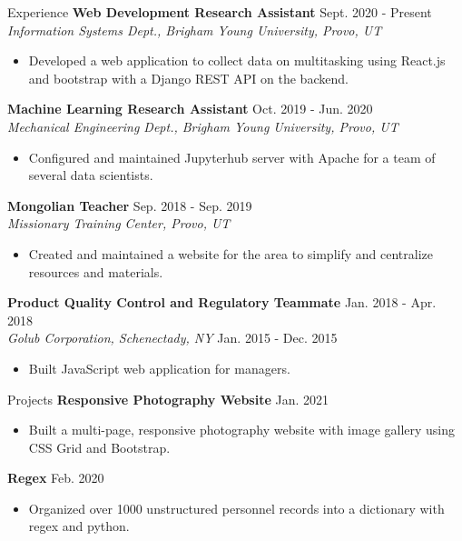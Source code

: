 \documentclass{resume} %
\begin{document}
\begin{rSection}{Experience}
    \textbf{Web Development Research Assistant}\hfill{ Sept.  2020 -
    Present}\\
    \textit{Information Systems Dept., Brigham Young University, Provo, UT} 
    \begin{itemize}
        \item Developed a web application to collect data on multitasking using React.js and
            bootstrap with a Django REST API on the backend. 
    \end{itemize}
\textbf{Machine Learning Research Assistant} \hfill{Oct. 2019
- Jun. 2020}\\
\textit{Mechanical Engineering Dept., Brigham Young University, Provo, UT}
    \begin{itemize}
        \item Configured and maintained Jupyterhub server with Apache for a team of
            several data scientists.
    \end{itemize}
\textbf{Mongolian Teacher} \hfill {Sep. 2018 - Sep. 2019}\\
\textit{Missionary Training Center, Provo, UT} 
    \begin{itemize}
        \item Created and maintained a website for the area to simplify and
            centralize resources and materials.
    \end{itemize}
\textbf{Product Quality Control and Regulatory Teammate}    \hfill {Jan. 2018 -
Apr. 2018}\\
\textit{Golub Corporation, Schenectady, NY}                 \hfill {Jan. 2015 -
Dec. 2015}  
    \begin{itemize}
        \item Built JavaScript web application for managers.
    \end{itemize}
\end{rSection}

\begin{rSection}{Projects}
    \textbf{Responsive Photography Website} \hfill{Jan. 2021}
    \begin{itemize}
        \item Built a multi-page, responsive photography website with image gallery using CSS Grid and
            Bootstrap.
    \end{itemize}
\textbf{Regex} \hfill{Feb. 2020}
    \begin{itemize}
        \item Organized over 1000 unstructured personnel records into a
            dictionary with regex and python.
    \end{itemize}
\end{rSection}
\end{document}
